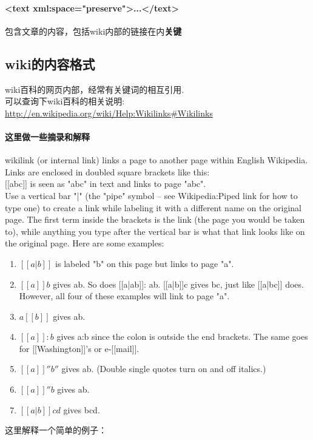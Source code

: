 \documentclass[a4paper]{ctexart}
\begin{document}
\paragraph{ <text xml:space="preserve">...</text>}
包含文章的内容，包括wiki内部的链接在内\textbf{关键}

\subsection{wiki的内容格式}
wiki百科的网页内部，经常有关键词的相互引用.\\
可以查询下wiki百科的相关说明:
\url{http://en.wikipedia.org/wiki/Help:Wikilinks\#Wikilinks}
\paragraph{
	这里做一些摘录和解释
}
wikilink (or internal link) links a page to another page within English Wikipedia. Links are enclosed in doubled square brackets like this:\\

 [[abc]] is seen as "abc" in text and links to page "abc".\\

	 Use a vertical bar "|" (the "pipe" symbol – see Wikipedia:Piped link for how to type one) to create a link while labeling it with a different name on the original page. The first term inside the brackets is the link (the page you would be taken to), while anything you type after the vertical bar is what that link looks like on the original page. Here are some examples:\\
\begin{enumerate}
	\item $[[a|b]]$ is labeled "b" on this page but links to page "a".
	\item $[[a]]b$ gives ab. So does [[a|ab]]: ab. [[a|b]]c gives bc, just like [[a|bc]] does. However, all four of these examples will link to page "a".
	\item $a[[b]]$ gives ab.
	\item $[[a]]:b$ gives a:b since the colon is outside the end brackets. The same goes for [[Washington]]'s or e-[[mail]].
	\item $[[a]]''b''$ gives ab. (Double single quotes turn on and off italics.)
	\item $[[a]]''b$ gives ab.
	\item $[[a|b]]cd$ gives bcd.
\end{enumerate}
这里解释一个简单的例子：\\
\end{document}
